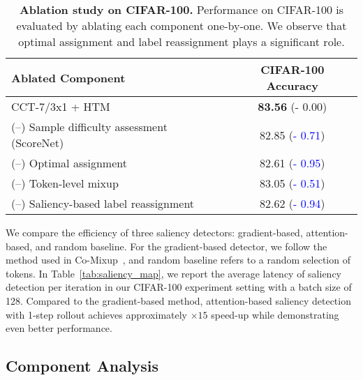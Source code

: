\documentclass{article}
\begin{document}
\begin{table}[t]
    \centering
    \setlength{\tabcolsep}{3.5pt}
    \caption{\footnotesize\textbf{Ablation study on CIFAR-100.} Performance on CIFAR-100 is evaluated by ablating each component one-by-one. We observe that optimal assignment and label reassignment plays a significant role.}
    \vspace{-3mm}
        \begin{adjustbox}{width=0.7\textwidth}
    \footnotesize
    \begin{tabular}[t]{l | c}
    \toprule
    \textbf{Ablated Component} & \textbf{CIFAR-100 Accuracy} \\
    \midrule
    CCT-7/3x1 + HTM & \textbf{83.56} (- 0.00) \\
    \hspace{4mm}(--) Sample difficulty assessment (ScoreNet) & 82.85 (\textcolor{blue}{- 0.71}) \\
    \hspace{4mm}(--) Optimal assignment & 82.61 (\textcolor{blue}{- 0.95}) \\
    \hspace{4mm}(--) Token-level mixup & 83.05 (\textcolor{blue}{- 0.51}) \\
    \hspace{4mm}(--) Saliency-based label reassignment \hspace{10mm} & 82.62 (\textcolor{blue}{- 0.94}) \\
    \bottomrule
    \end{tabular}
    \end{adjustbox}
    \label{tab:ablation}
\end{table} \vspace{-3mm}
We compare the efficiency of three saliency detectors: gradient-based, attention-based, and random baseline.
For the gradient-based detector, we follow the method used in Co-Mixup~\cite{kim2021co}, and random baseline refers to a random selection of tokens.
In Table~\ref{tab:saliency_map}, we report the average latency of saliency detection per iteration in our CIFAR-100 experiment setting with a batch size of 128.
Compared to the gradient-based method, attention-based saliency detection with 1-step rollout achieves approximately $\times15$ speed-up while demonstrating even better performance.
 \subsection{Component Analysis}
\end{document}

